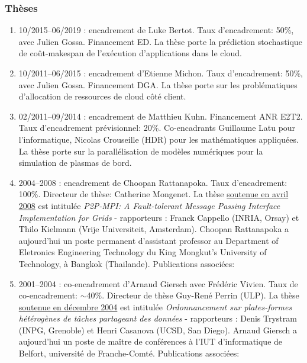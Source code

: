\subsubsection{Thèses}
\begin{enumerate}

\item 10/2015--06/2019 : encadrement de Luke Bertot. Taux d'encadrement: 50\%,
avec Julien Gossa. Financement ED. La thèse porte la prédiction stochastique
de coût-makespan de l'exécution d'applications dans le cloud.

\item 10/2011--06/2015 : encadrement d'Etienne Michon. Taux d'encadrement: 50\%,
avec Julien Gossa. Financement DGA. La thèse porte sur les problématiques
d'allocation de ressources de cloud côté client.\\

\item 02/2011--09/2014 : encadrement de Matthieu Kuhn. Financement ANR E2T2. 
Taux d'encadrement prévisionnel: 20\%. Co-encadrants Guillaume Latu pour 
l'informatique, Nicolas Crouseille (HDR) pour les mathématiques appliquées. 
La thèse porte sur la parallélisation de modèles 
numériques pour la simulation de plasmas de bord.\\

\item 2004--2008 : encadrement de Choopan Rattanapoka. Taux d'encadrement: 100\%. 
Directeur de thèse: Catherine Mongenet. La thèse \underline{soutenue en avril 2008} 
est intitulée \textit{P2P-MPI: A Fault-tolerant Message Passing Interface Implementation 
for Grids} - rapporteurs : Franck Cappello (INRIA, Orsay) et Thilo Kielmann (Vrije 
Universiteit, Amsterdam). Choopan Rattanapoka a aujourd'hui un poste permanent 
d'assistant professor au Department of Eletronics Engineering Technology du King 
Mongkut's University of Technology, à Bangkok (Thailande).
Publications associées: 
\cite{icps-2005-155,icps-2007-182,icps-2007-185,
      icps-2008-188,icps-2008-193,icps-2009-214,
	icps-2009-217,icps-book}\\


\item 2001--2004 : co-encadrement d'Arnaud Giersch avec Frédéric Vivien. 
Taux de co-encadrement: $\sim$40\%. Directeur de thèse Guy-René Perrin (ULP).
La thèse \underline{soutenue en décembre 2004} est intitulée \textit{Ordonnancement 
sur plates-formes hétérogènes de tâches partageant des données} - rapporteurs : Denis 
Trystram (INPG, Grenoble) et Henri Casanova (UCSD, San Diego). Arnaud Giersch a 
aujourd'hui un poste de maître de conférences à l'IUT d'informatique de Belfort, 
université de Franche-Comté.
Publications associées: \cite{icps-2002-62,icps-2003-75,icps-2004-125}\\



\end{enumerate}
